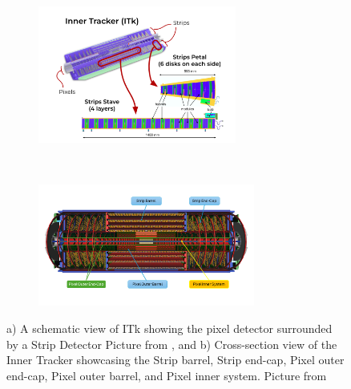 \begin{figure}[h]
    \centering
    \begin{subfigure}[t]{0.45\textwidth}
        \centering
        \includegraphics[height=4.5cm]{Figures/Intro/component.PNG}
        \caption{} \label{fig:ITklayout1}
    \end{subfigure}
    ~ 
    \begin{subfigure}[t]{0.45\textwidth}
        \centering
        \includegraphics[height=4cm]{Figures/Intro/fig_07Edited.png}
        \caption{}
        \label{fig:ITklayout2}
    \end{subfigure}
    \caption{a) A schematic view of ITk showing the pixel detector surrounded by a Strip Detector Picture from \cite{itkcomponent}, and b) Cross-section view of the Inner Tracker showcasing the Strip barrel, Strip end-cap, Pixel outer end-cap, Pixel outer barrel, and Pixel inner system. Picture from \cite{ATL-PHYS-PUB-2021-024}} 
    \label{fig:ITklayout}
\end{figure}





